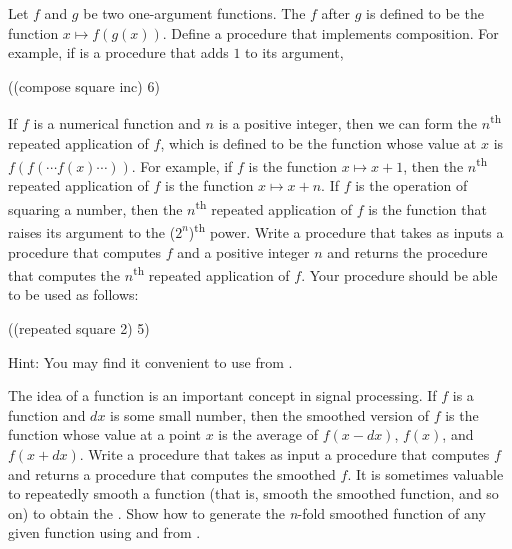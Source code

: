 \begin{exercise}
	\label{Exercise 1.42}
	Let \( f \) and \( g \) be two one-argument functions.
	The  \( f \) after \( g \) is defined to be the function \( x \mapsto f(g(x)) \).
	Define a procedure  that implements composition.
	For example, if  is a procedure that adds \( 1 \) to its argument,
	\begin{scheme}
	  ((compose square inc) 6)
	  ~~
	\end{scheme}
\end{exercise}

\begin{exercise}
	\label{Exercise 1.43}
	If \( f \) is a numerical function and \( n \) is a positive integer, then we can form the \( n \)\textsuperscript{th} repeated application of \( f \), which is defined to be the function whose value at \( x \) is \( f(f( \dotsm f(x) \dotsm )) \).
	For example, if \( f \) is the function \( x \mapsto x + 1 \), then the \( n \)\textsuperscript{th} repeated application of \( f \) is the function \( x \mapsto x + n \).
	If \( f \) is the operation of squaring a number, then the \( n \)\textsuperscript{th} repeated application of \( f \) is the function that raises its argument to the (\( 2^n \))\textsuperscript{th} power.
	Write a procedure that takes as inputs a procedure that computes \( f \) and a positive integer \( n \) and returns the procedure that computes the \( n \)\textsuperscript{th} repeated application of \( f \).
	Your procedure should be able to be used as follows:
	\begin{scheme}
	  ((repeated square 2) 5)
	  ~\outprint{625}~
	\end{scheme}
	Hint:
	You may find it convenient to use  from .
\end{exercise}



\begin{exercise}
	\label{Exercise 1.44}
	The idea of  a function is an important concept in signal processing.
	If \( f \) is a function and \( dx \) is some small number, then the smoothed version of \( f \) is the function whose value at a point \( x \) is the average of \( f(x - dx) \), \( f(x) \), and \( f(x + dx) \).
	Write a procedure  that takes as input a procedure that computes \( f \) and returns a procedure that computes the smoothed \( f \).
	It is sometimes valuable to repeatedly smooth a function (that is, smooth the smoothed function, and so on) to obtain the .
	Show how to generate the \textit{n}-fold smoothed function of any given function using  and  from .
\end{exercise}



